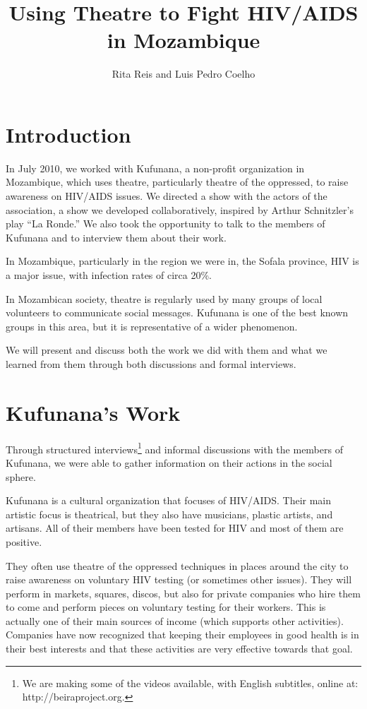 \documentclass[article,twocolumn]{memoir}
\title{Using Theatre to Fight HIV/AIDS in Mozambique}
\author{Rita Reis and Luis Pedro Coelho}
\date{}
\begin{document}
\maketitle

\chapter{Introduction}

In July 2010, we worked with Kufunana, a non-profit organization in Mozambique,
which uses theatre, particularly theatre of the oppressed, to raise awareness
on HIV/AIDS issues. We directed a show with the actors of the association, a
show we developed collaboratively, inspired by Arthur Schnitzler's play ``La
Ronde.'' We also took the opportunity to talk to the members of Kufunana and to
interview them about their work.

In Mozambique, particularly in the region we were in, the Sofala province, HIV
is a major issue, with infection rates of circa 20\%.

In Mozambican society, theatre is regularly used by many groups of local
volunteers to communicate social messages. Kufunana is one of the best known
groups in this area, but it is representative of a wider phenomenon.

We will present and discuss both the work we did with them and what we learned
from them through both discussions and formal interviews.

\chapter{Kufunana's Work}

Through structured interviews\footnote{We are making some of the videos
available, with English subtitles, online at: http://beiraproject.org.} and
informal discussions with the members of Kufunana, we were able to gather
information on their actions in the social sphere.

Kufunana is a cultural organization that focuses of HIV/AIDS. Their main
artistic focus is theatrical, but they also have musicians, plastic artists,
and artisans. All of their members have been tested for HIV and most of them are
positive.

They often use theatre of the oppressed techniques in places around the city to
raise awareness on voluntary HIV testing (or sometimes other issues). They will
perform in markets, squares, discos, but also for private companies who hire
them to come and perform pieces on voluntary testing for their workers. This is
actually one of their main sources of income (which supports other activities).
Companies have now recognized that keeping their employees in good health is in
their best interests and that these activities are very effective towards that
goal.
\end{document}
